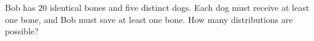 Bob has $20$ identical bones and five distinct dogs. Each dog must receive at least one bone, and Bob must save at least one bone. How many distributions are possible?
